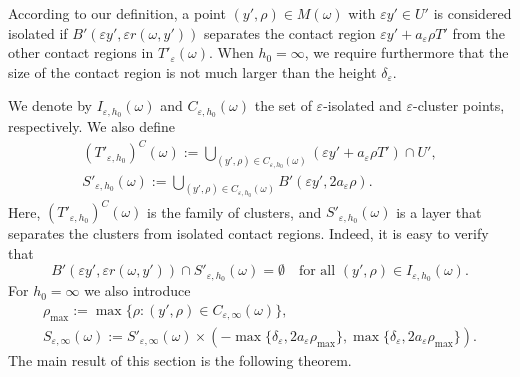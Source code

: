 \documentclass{article}
\numberwithin{equation}{section}
\theoremstyle{definition}
\theoremstyle{remark}
\begin{document}
According to our definition, a point $(y', \rho) \in M(\omega)$ with $\varepsilon y' \in U'$ is considered isolated if $B'(\varepsilon y', \varepsilon r(\omega, y'))$ separates the contact region $\varepsilon y' + a_\varepsilon \rho T'$ from the other contact regions in $T'_\varepsilon(\omega)$. When $h_0 = \infty$, we require furthermore that the size of the contact region is not much larger than the height $\delta_\varepsilon$.

We denote by $I_{\varepsilon, h_0}(\omega)$ and $C_{\varepsilon, h_0}(\omega)$ the set of $\varepsilon$-isolated and $\varepsilon$-cluster points, respectively. We also define
\begin{gather*}
    (T'_{\varepsilon, h_0})^C(\omega) := \bigcup_{(y', \rho) \in C_{\varepsilon, h_0}(\omega)} (\varepsilon y' + a_\varepsilon \rho T') \cap U', \\
    S'_{\varepsilon, h_0}(\omega) := \bigcup_{(y', \rho) \in C_{\varepsilon, h_0}(\omega)} B'(\varepsilon y', 2a_\varepsilon \rho).
\end{gather*}
Here, $(T'_{\varepsilon, h_0})^C(\omega)$ is the family of clusters, and $S'_{\varepsilon, h_0}(\omega)$ is a layer that separates the clusters from isolated contact regions. Indeed, it is easy to verify that
\begin{equation} \label{eq:separation_layer}
    B'(\varepsilon y', \varepsilon r(\omega, y')) \cap S'_{\varepsilon, h_0}(\omega) = \emptyset \quad \text{for all } (y', \rho) \in I_{\varepsilon, h_0}(\omega).
\end{equation}
For $h_0 = \infty$ we also introduce
\begin{gather*}
    \rho_{\max} := \max \{\rho: (y', \rho) \in C_{\varepsilon, \infty}(\omega)\}, \\
    S_{\varepsilon, \infty}(\omega) := S'_{\varepsilon, \infty}(\omega) \times (-\max\{\delta_\varepsilon, 2 a_\varepsilon \rho_{\max}\}, \max\{\delta_\varepsilon, 2 a_\varepsilon \rho_{\max}\}).
\end{gather*}
The main result of this section is the following theorem.
\end{document}
